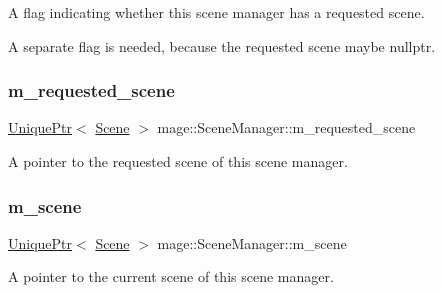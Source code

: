 A flag indicating whether this scene manager has a requested scene.

A separate flag is needed, because the requested scene maybe {\ttfamily nullptr}. \hypertarget{classmage_1_1_scene_manager_a74bdb7b0805208b039991e9b9abc741f}{}\label{classmage_1_1_scene_manager_a74bdb7b0805208b039991e9b9abc741f} 
\subsubsection{\texorpdfstring{m\+\_\+requested\+\_\+scene}{m\_requested\_scene}}
{\footnotesize\ttfamily \hyperlink{namespacemage_a3316d7143a973e37adf1110f2e80ca31}{Unique\+Ptr}$<$ \hyperlink{classmage_1_1_scene}{Scene} $>$ mage\+::\+Scene\+Manager\+::m\+\_\+requested\+\_\+scene\hspace{0.3cm}{\ttfamily [private]}}

A pointer to the requested scene of this scene manager. \hypertarget{classmage_1_1_scene_manager_a774c610dba3ece25acf97915b6368a1a}{}\label{classmage_1_1_scene_manager_a774c610dba3ece25acf97915b6368a1a} 
\subsubsection{\texorpdfstring{m\+\_\+scene}{m\_scene}}
{\footnotesize\ttfamily \hyperlink{namespacemage_a3316d7143a973e37adf1110f2e80ca31}{Unique\+Ptr}$<$ \hyperlink{classmage_1_1_scene}{Scene} $>$ mage\+::\+Scene\+Manager\+::m\+\_\+scene\hspace{0.3cm}{\ttfamily [private]}}

A pointer to the current scene of this scene manager. 